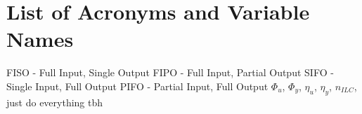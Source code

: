 
\chapter*{List of Acronyms and Variable Names}


FISO - Full Input, Single Output
FIPO - Full Input, Partial Output
SIFO - Single Input, Full Output
PIFO - Partial Input, Full Output
$\Phi_u$, $\Phi_y$, $\eta_u$, $\eta_y$, $n_{ILC}$, just do everything tbh




\printglossary[type=acronym]